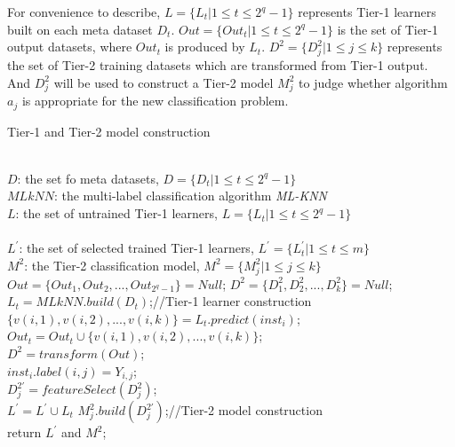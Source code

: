 \documentclass[review,3p,twocolumn,times]{elsarticle}
\begin{document}
For convenience to describe, $L = \{L_t|1 \leq t \leq 2^q-1\}$ represents Tier-1 learners built on each meta dataset $D_t$. $Out = \{Out_t|1 \leq t \leq 2^q-1\}$ is the set of Tier-1 output datasets, where $Out_t$ is produced by $L_t$. $D^2 =\{D^2_j|1 \leq j \leq k\}$ represents the set of Tier-2 training datasets which are transformed from Tier-1 output. And $D^2_j$ will be used to construct a Tier-2 model $M^2_j$ to judge whether algorithm $a_j$ is appropriate for the new classification problem. 


\begin{algorithm}[!h]
	\footnotesize
	\caption{Tier-1 and Tier-2 model construction}
	\label{pro:model construction}
	\begin{algorithmic}[1]
		
		\REQUIRE ~~\\
		${D}$: the set fo meta datasets, $D =\{D_t|1 \leq t \leq 2^q-1\}$ \\
		$MLkNN$: the multi-label classification algorithm \emph{ML-KNN} \\
		$L$: the set of untrained Tier-1 learners, $L = \{L_t|1 \leq t \leq 2^q-1\}$\\
		\ENSURE ~~\\
		$L^{'}$: the set of selected trained Tier-1 learners, $L^{'} = \{L_t^{'}|1 \leq t \leq m\}$\\
		$M^2$: the Tier-2 classification model, $M^2 =\{M^2_j|1 \leq j \leq k\}$\\
		\STATE $Out = \{Out_1,Out_2, ...,Out_{2^q-1}\} = Null$;
		\STATE $D^2 = \{D^2_1,D^2_2, ..., D^2_k\} = Null$;
		\STATE $L_t = MLkNN.build(D_t)$;\quad\scriptsize{//Tier-1 learner construction}\\
		\ENDFOR
		\STATE $\{v(i,1),v(i,2), ...,v(i,k)\} = L_t.predict(inst_i)$;\\
		\STATE $Out_t = Out_t \cup {\{v(i,1),v(i,2), ...,v(i,k)\}}$;\\
		\ENDFOR
		\ENDFOR
		\STATE $D^2 = transform(Out)$;\\
		\STATE $inst_i.label(i,j) = Y_{i,j}$;\\
		\ENDFOR
		\ENDFOR
		\STATE $D^{2'}_j = featureSelect(D^2_j)$;\\
		\STATE $L^{'} = L^{'} \cup L_t$
		\ENDIF
		\ENDFOR
		\STATE $M^2_j.build(D^{2'}_j)$;\quad\scriptsize{//Tier-2 model construction}\\
		\ENDFOR
		\STATE return $L^{'}$ and $M^2$;\\
	\end{algorithmic}
\end{algorithm}  
\end{document}
